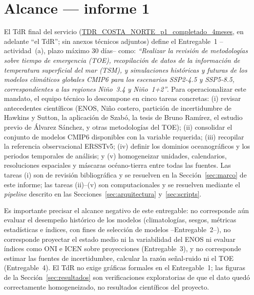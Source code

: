 \documentclass[11pt,a4paper]{article}
\newcommand{\archivo}[1]{\begingroup\hypersetup{urlcolor=black}\url{#1}\endgroup}
\begin{document}
\section{Alcance --- informe 1}
\label{sec:alcance}

El TdR final del servicio (\archivo{TDR_COSTA_NORTE_p1_completado_4meses}, en adelante ``el TdR''; sin anexos t\'ecnicos adjuntos) define el Entregable~1 --actividad~(a), plazo m\'aximo 30 d\'ias-- como: \emph{``Realizar la revisi\'on de metodolog\'ias sobre tiempo de emergencia (TOE), recopilaci\'on de datos de la informaci\'on de temperatura superficial del mar (TSM), y simulaciones hist\'oricas y futuras de los modelos clim\'aticos globales CMIP6 para los escenarios SSP2-4.5 y SSP5-8.5, correspondientes a las regiones Ni\~no~3.4 y Ni\~no~1+2''}. Para operacionalizar este mandato, el equipo t\'ecnico lo descompone en cinco tareas concretas: (i) revisar antecedentes cient\'ificos (ENOS, Ni\~no costero, partici\'on de incertidumbre de Hawkins y Sutton, la aplicaci\'on de Szab\'o, la tesis de Bruno Ram\'irez, el estudio previo de \'Alvarez S\'anchez, y otras metodolog\'ias del TOE); (ii) consolidar el conjunto de modelos CMIP6 disponibles con la variable requerida; (iii) recopilar la referencia observacional ERSSTv5; (iv) definir los dominios oceanogr\'aficos y los periodos temporales de an\'alisis; y (v) homogeneizar unidades, calendarios, resoluciones espaciales y m\'ascaras oc\'eano-tierra entre todas las fuentes. Las tareas (i) son de revisi\'on bibliogr\'afica y se resuelven en la Secci\'on~\ref{sec:marco} de este informe; las tareas (ii)--(v) son computacionales y se resuelven mediante el \emph{pipeline} descrito en las Secciones~\ref{sec:arquitectura} y~\ref{sec:scripts}.

Es importante precisar el alcance negativo de este entregable: no corresponde a\'un evaluar el desempe\~no hist\'orico de los modelos (climatolog\'ias, sesgos, m\'etricas estad\'isticas e \'indices, con fines de selecci\'on de modelos --Entregable~2--), no corresponde proyectar el estado medio ni la variabilidad del ENOS ni evaluar \'indices como ONI e ICEN sobre proyecciones (Entregable~3), y no corresponde estimar las fuentes de incertidumbre, calcular la raz\'on se\~nal-ruido ni el TOE (Entregable~4). El TdR no exige gr\'aficas formales en el Entregable~1; las figuras de la Secci\'on~\ref{sec:resultados} son verificaciones exploratorias de que el dato qued\'o correctamente homogeneizado, no resultados cient\'ificos del proyecto.
\end{document}
